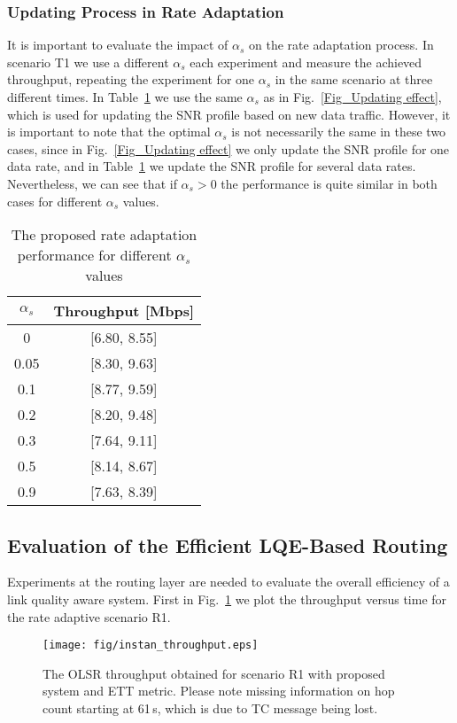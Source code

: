 \documentclass[11pt,draftclsnofoot,journal,onecolumn]{IEEEtran}
\begin{document}
\subsubsection{Updating Process in Rate Adaptation}
\label{sec:rate_updating_based}

It is important to evaluate the impact of $\alpha_s$ on the rate adaptation process. In scenario T1 we use a different $\alpha_s$ each experiment and measure the achieved throughput,  repeating the experiment for one $\alpha_s$ in the same scenario at three different times. In Table~\ref{Tab_alpha_value} we use the same $\alpha_s$ as in Fig.~\ref{Fig_Updating effect}, which is used for updating the SNR profile based on new data traffic. However, it is important to note that the optimal $\alpha_s$ is not necessarily the same in these two cases, since in Fig.~\ref{Fig_Updating effect} we only update the SNR profile for one data rate, and in Table~\ref{Tab_alpha_value} we update the SNR profile for several data rates. Nevertheless, we can see that if $\alpha_s>0$ the performance is quite similar in both cases for different $\alpha_s$ values.

\begin{table}
\centering
\caption{The proposed rate adaptation performance for different $\alpha_s$ values}
\label{Tab_alpha_value}
\begin{tabular}{c|c}
\hline
$\alpha_s$ & Throughput [Mbps]\\
\hline\hline
0 & [6.80, 8.55]\\
0.05 & [8.30, 9.63]\\
0.1 & [8.77, 9.59]\\
0.2 & [8.20, 9.48]\\
0.3 & [7.64, 9.11]\\
0.5 & [8.14, 8.67]\\
0.9 & [7.63, 8.39]\\
\hline
\end{tabular}
\end{table}

\subsection{Evaluation of the Efficient LQE-Based Routing}
\label{sec:result_routing_improvement}

Experiments at the routing layer are needed to evaluate the overall
efficiency of a link quality aware system. First in
Fig.~\ref{Fig_result_route_mobile_instan} we plot the throughput
versus time for the rate adaptive scenario R1.
\begin{figure}
\centering
\texttt{[image: fig/instan\_throughput.eps]}
\caption{The OLSR throughput obtained for scenario R1 with proposed system and ETT metric. Please note missing information on hop count starting at 61\,s, which is due to TC message being lost.}
\label{Fig_result_route_mobile_instan}
\end{figure}
\end{document}
